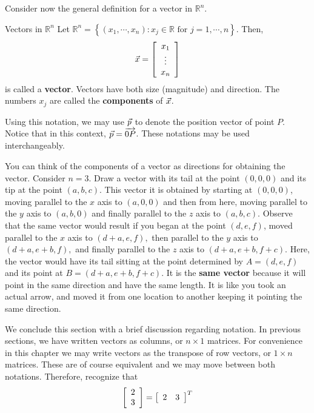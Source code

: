 Consider now the general definition for a vector in $\mathbb{R}^n$. 

\begin{definition}{Vectors in $\mathbb{R}^n$}\label{def:vectorsRn}
Let $\mathbb{R}^{n} = \left\{ \left( x_{1}, \cdots, x_{n}\right)
:x_{j}\in \mathbb{R}\text{ for }j=1,\cdots ,n\right\} .$
Then,
\begin{equation*}
\vec{x}
=
\left[ \begin{array}{c}
x_{1} \\
\vdots \\
x_{n}
\end{array}
\right] 
\end{equation*}
is called a \textbf{vector}. Vectors have both size (magnitude) and direction. 
The numbers $x_{j}$ are called the \textbf{components}  of $\vec{x}$. 
\end{definition}

Using this notation, we may use $\vec{p}$ to denote the position vector of point $P$. Notice that in this context, $\vec{p} = \overrightarrow{0P}$. These notations may be used interchangeably. 

You can think of the components of a vector as directions for
obtaining the vector. Consider $n=3$.  Draw a vector with its tail at
the point $\left( 0,0,0\right) $ and its tip at the point $\left(
a,b,c\right) $. This vector it is obtained by starting at $\left(
0,0,0\right) $, moving parallel to the $x$ axis to $\left(
a,0,0\right) $ and then from here, moving parallel to the $y$ axis to
$\left( a,b,0\right) $ and finally parallel to the $z$ axis to $\left(
a,b,c\right). $ Observe that the same vector would result if you began
at the point $ \left( d,e,f \right)$, moved parallel to the $x$ axis
to $\left( d+a,e,f\right) ,$ then parallel to the $y$ axis to $\left(
d+a,e+b,f\right) ,$ and finally parallel to the $z$ axis to $\left(
d+a,e+b,f+c\right)$. Here, the vector would have its tail sitting at
the point determined by $A= \left( d,e,f\right) $ and its point at
$B=\left( d+a,e+b,f+c\right) .$ It is the \textbf{same vector} because
it will point in the same direction and have the same length. It is
like you took an actual arrow,  and moved it from one location to another keeping it pointing
the same direction.

We conclude this section with a brief discussion regarding notation. In previous sections, we have written vectors as columns, or $n \times 1$ matrices. For convenience in this chapter we may write vectors as the transpose of row vectors, or $1 \times n$ matrices. These are of course equivalent and we may move between both notations. Therefore, recognize that 
\[
\left[
\begin{array}{r}
2 \\
3
\end{array}
\right]  = \left[
\begin{array}{rr}
2 & 3
\end{array}
\right]^T 
\]

